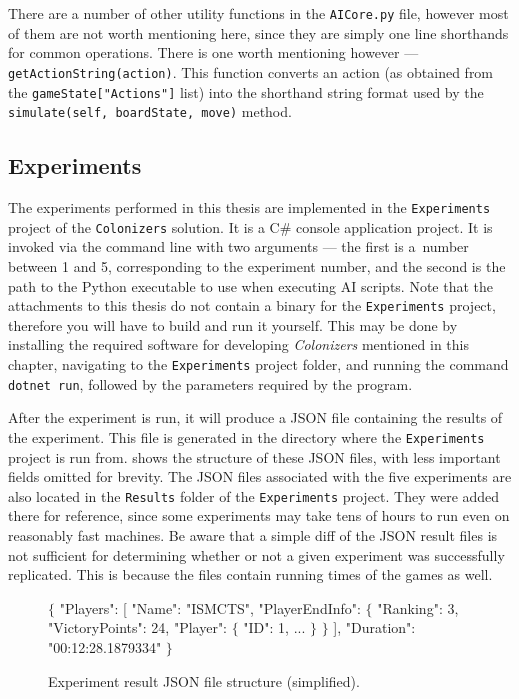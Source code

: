 There are a number of other utility functions in the \texttt{AICore.py} file,
however most of them are not worth mentioning here, since they are simply one line
shorthands for common operations. There is one worth mentioning however ---
\texttt{getActionString(action)}. This function converts an action (as obtained from
the \texttt{gameState["Actions"]} list) into the shorthand string format
used by the \texttt{simulate(self, boardState, move)} method.

\subsection{Experiments}
\label{chap:experimentdocs}

The experiments performed in this thesis are implemented in the \texttt{Experiments}
project of the \texttt{Colonizers} solution. It is a C\# console application project.
It is invoked via the command line with two arguments --- the first is a~number
between 1 and 5, corresponding to the experiment number, and the second
is the path to the Python executable to use when executing AI scripts.
Note that the attachments to this thesis do not contain a binary
for the \texttt{Experiments} project, therefore you will have to build and
run it yourself. This may be done by installing the required software for
developing \emph{Colonizers} mentioned in this chapter, navigating to the
\texttt{Experiments} project folder, and running the command \texttt{dotnet run},
followed by the parameters required by the program.

After the experiment is run, it will produce a JSON file containing the results
of the experiment. This file is generated in the directory where the \texttt{Experiments}
project is run from.
 shows the structure of these JSON files, with less
important fields omitted for brevity. The JSON files associated with the five
experiments are also located in the \texttt{Results} folder of the \texttt{Experiments}
project. They were added there for reference, since
some experiments may take tens of hours to run even on reasonably fast
machines. Be aware that a simple diff of the JSON result files
is not sufficient for determining whether or not a given experiment was successfully
replicated. This is because the files contain running times of the games as well.

\begin{figure}[ht]
\begin{code}[commandchars=\\\{\},codes={\catcode`\$=3\catcode`\^=7\catcode`\_=8}]
$\{$
    "Players": [
        "Name": "ISMCTS",
        "PlayerEndInfo": $\{$
            "Ranking": 3,
            "VictoryPoints": 24,
            "Player": $\{$
                "ID": 1,
                ...
            $\}$
        $\}$
    ],
    "Duration": "00:12:28.1879334"
$\}$
\end{code}
\caption{Experiment result JSON file structure (simplified).}\label{dd:experimentjson}
\end{figure}

